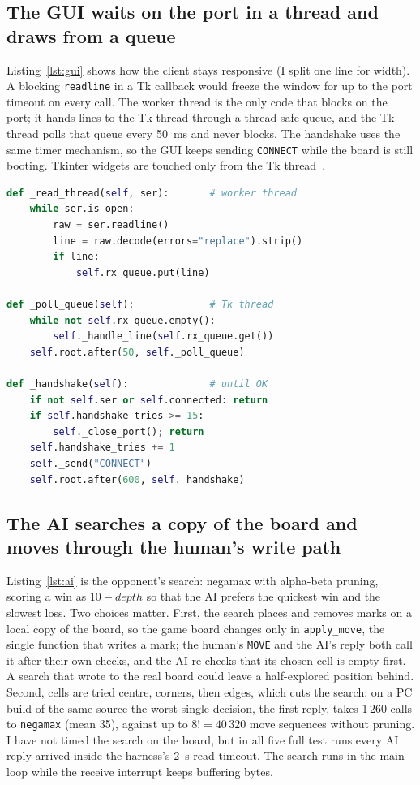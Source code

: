 \subsection{The GUI waits on the port in a thread and draws from a queue}
Listing~\ref{lst:gui} shows how the client stays responsive (I split one line for width). A blocking
\texttt{readline} in a Tk callback would freeze the window for up to the
port timeout on every call. The worker thread is the only code that blocks on
the port; it hands lines to the Tk thread through a thread-safe queue, and the
Tk thread polls that queue every 50~ms and never blocks. The handshake uses
the same timer mechanism, so the GUI keeps sending \texttt{CONNECT} while the
board is still booting. Tkinter widgets are touched only from the Tk
thread~\cite{tkinter}.

\begin{lstlisting}[float=tp, language=Python, caption={Reader thread, queue polling and handshake (\texttt{gui\_client.py}).}, label=lst:gui]
def _read_thread(self, ser):       # worker thread
    while ser.is_open:
        raw = ser.readline()
        line = raw.decode(errors="replace").strip()
        if line:
            self.rx_queue.put(line)

def _poll_queue(self):             # Tk thread
    while not self.rx_queue.empty():
        self._handle_line(self.rx_queue.get())
    self.root.after(50, self._poll_queue)

def _handshake(self):              # until OK
    if not self.ser or self.connected: return
    if self.handshake_tries >= 15:
        self._close_port(); return
    self.handshake_tries += 1
    self._send("CONNECT")
    self.root.after(600, self._handshake)
\end{lstlisting}

\subsection{The AI searches a copy of the board and moves through the human's write path}
Listing~\ref{lst:ai} is the opponent's search: negamax with alpha-beta pruning,
scoring a win as $10-\mathit{depth}$ so that the AI prefers the quickest win and
the slowest loss. Two choices matter. First, the search places and removes marks
on a local copy of the board, so the game board changes only in
\texttt{apply\_move}, the single function that writes a mark; the human's
\texttt{MOVE} and the AI's reply both call it after their own checks, and the AI
re-checks that its chosen cell is empty first. A search that wrote to the real board
could leave a half-explored position behind. Second, cells are tried centre,
corners, then edges, which cuts the search: on a PC build of the same source the
worst single decision, the first reply, takes 1\,260 calls to \texttt{negamax}
(mean 35), against up to $8! = 40\,320$ move sequences without pruning. I have
not timed the search on the board, but in all five full test runs every AI reply
arrived inside the harness's 2~s read timeout. The search runs in the main loop
while the receive interrupt keeps buffering bytes.

